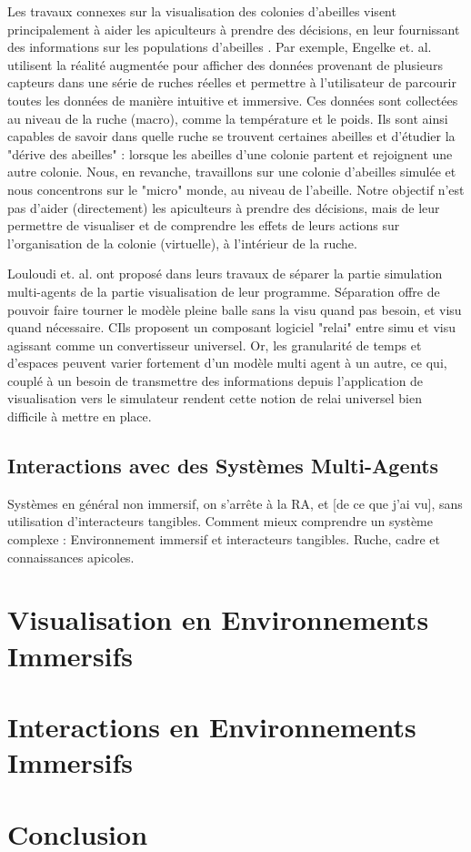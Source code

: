 		Les travaux connexes sur la visualisation des colonies d'abeilles visent principalement à aider les apiculteurs à prendre des décisions, en leur fournissant des informations sur les populations d'abeilles \cite{engelke_visual_2016, engelke_melissar_2016, nguyen_augmented_2017}. Par exemple, Engelke et. al. \cite{engelke_visual_2016} utilisent la réalité augmentée pour afficher des données provenant de plusieurs capteurs dans une série de ruches réelles et permettre à l'utilisateur de parcourir toutes les données de manière intuitive et immersive. Ces données sont collectées au niveau de la ruche (macro), comme la température et le poids. Ils sont ainsi capables de savoir dans quelle ruche se trouvent certaines abeilles et d'étudier la "dérive des abeilles" : lorsque les abeilles d'une colonie partent et rejoignent une autre colonie. Nous, en revanche, travaillons sur une colonie d'abeilles simulée et nous concentrons sur le "micro" monde, au niveau de l'abeille. Notre objectif n'est pas d'aider (directement) les apiculteurs à prendre des décisions, mais de leur permettre de visualiser et de comprendre les effets de leurs actions sur l'organisation de la colonie (virtuelle), à l'intérieur de la ruche.
		
		Louloudi et. al. \cite{louloudi_new_2012} ont proposé dans leurs travaux de séparer la partie simulation multi-agents de la partie visualisation de leur programme. Séparation offre de pouvoir faire tourner le modèle pleine balle sans la visu quand pas besoin, et visu quand nécessaire. CIls proposent un composant logiciel "relai" entre simu et visu agissant comme un convertisseur universel. Or, les granularité de temps et d'espaces peuvent varier fortement d'un modèle multi agent à un autre, ce qui, couplé à un besoin de transmettre des informations depuis l'application de visualisation vers le simulateur rendent cette notion de relai universel bien difficile à mettre en place.
		
		
		\subsection{Interactions avec des Systèmes Multi-Agents}
		Systèmes en général non immersif, on s'arrête à la RA, et [de ce que j'ai vu], sans utilisation d'interacteurs tangibles.
	Comment mieux comprendre un système complexe : Environnement immersif et interacteurs tangibles. Ruche, cadre et connaissances apicoles.
	\section{Visualisation en Environnements Immersifs}
	\section{Interactions en Environnements Immersifs}			
	\section*{Conclusion}